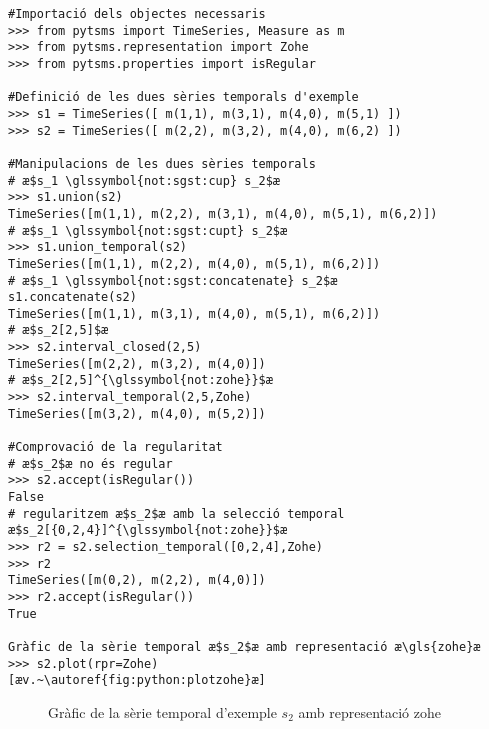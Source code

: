\begin{lstlisting}[style=py,caption=Exemple d'operacions amb Pytsms,label=lst:pytsms:ex1]
#Importació dels objectes necessaris
>>> from pytsms import TimeSeries, Measure as m
>>> from pytsms.representation import Zohe
>>> from pytsms.properties import isRegular

#Definició de les dues sèries temporals d'exemple
>>> s1 = TimeSeries([ m(1,1), m(3,1), m(4,0), m(5,1) ])
>>> s2 = TimeSeries([ m(2,2), m(3,2), m(4,0), m(6,2) ])

#Manipulacions de les dues sèries temporals
# æ$s_1 \glssymbol{not:sgst:cup} s_2$æ
>>> s1.union(s2)
TimeSeries([m(1,1), m(2,2), m(3,1), m(4,0), m(5,1), m(6,2)])
# æ$s_1 \glssymbol{not:sgst:cupt} s_2$æ
>>> s1.union_temporal(s2)
TimeSeries([m(1,1), m(2,2), m(4,0), m(5,1), m(6,2)])
# æ$s_1 \glssymbol{not:sgst:concatenate} s_2$æ
s1.concatenate(s2) 
TimeSeries([m(1,1), m(3,1), m(4,0), m(5,1), m(6,2)])
# æ$s_2[2,5]$æ
>>> s2.interval_closed(2,5)
TimeSeries([m(2,2), m(3,2), m(4,0)])
# æ$s_2[2,5]^{\glssymbol{not:zohe}}$æ
>>> s2.interval_temporal(2,5,Zohe)
TimeSeries([m(3,2), m(4,0), m(5,2)])

#Comprovació de la regularitat
# æ$s_2$æ no és regular
>>> s2.accept(isRegular())
False
# regularitzem æ$s_2$æ amb la selecció temporal æ$s_2[{0,2,4}]^{\glssymbol{not:zohe}}$æ
>>> r2 = s2.selection_temporal([0,2,4],Zohe)
>>> r2
TimeSeries([m(0,2), m(2,2), m(4,0)])
>>> r2.accept(isRegular())
True

Gràfic de la sèrie temporal æ$s_2$æ amb representació æ\gls{zohe}æ
>>> s2.plot(rpr=Zohe)
[æv.~\autoref{fig:python:plotzohe}æ]
\end{lstlisting}




\begin{figure}[tp]
  \centering
   \caption{Gràfic de la sèrie temporal d'exemple $s_2$ amb
     representació \gls{zohe}}
   \label{fig:python:plotzohe}
\end{figure}




